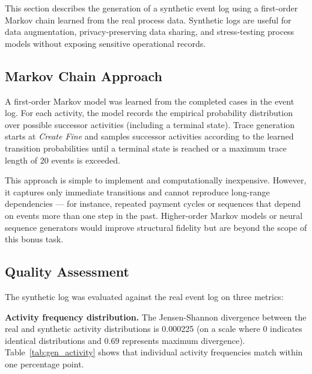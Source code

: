 
This section describes the generation of a synthetic event log using a first-order Markov chain learned from the real process data. Synthetic logs are useful for data augmentation, privacy-preserving data sharing, and stress-testing process models without exposing sensitive operational records.

\subsection{Markov Chain Approach}
\label{sub:markov_chain}

A first-order Markov model was learned from the completed cases in the event log. For each activity, the model records the empirical probability distribution over possible successor activities (including a terminal state). Trace generation starts at \textit{Create Fine} and samples successor activities according to the learned transition probabilities until a terminal state is reached or a maximum trace length of 20 events is exceeded.

This approach is simple to implement and computationally inexpensive. However, it captures only immediate transitions and cannot reproduce long-range dependencies — for instance, repeated payment cycles or sequences that depend on events more than one step in the past. Higher-order Markov models or neural sequence generators would improve structural fidelity but are beyond the scope of this bonus task.

\subsection{Quality Assessment}
\label{sub:gen_quality}

The synthetic log was evaluated against the real event log on three metrics:

\textbf{Activity frequency distribution.} The Jensen-Shannon divergence between the real and synthetic activity distributions is 0.000225 (on a scale where 0 indicates identical distributions and 0.69 represents maximum divergence). Table~\ref{tab:gen_activity} shows that individual activity frequencies match within one percentage point.


